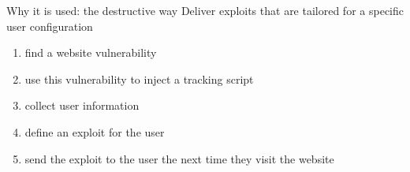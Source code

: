 \begin{frame}{Why it is used: the destructive way}
  Deliver exploits that are tailored for a specific user configuration
  \vspace{0.5cm}
  \begin{enumerate}
    \item find a website vulnerability
          \vspace{0.5cm}
    \item use this vulnerability to inject a tracking script
          \vspace{0.5cm}
    \item collect user information
          \vspace{0.5cm}
    \item define an exploit for the user
          \vspace{0.5cm}
    \item send the exploit to the user the next time they visit the website
  \end{enumerate}
\end{frame}
